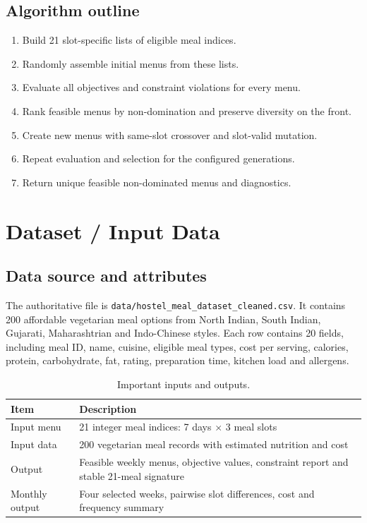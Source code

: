 \documentclass[12pt,a4paper]{report}
\begin{document}
\section{Algorithm outline}
\begin{enumerate}
\item Build 21 slot-specific lists of eligible meal indices.
\item Randomly assemble initial menus from these lists.
\item Evaluate all objectives and constraint violations for every menu.
\item Rank feasible menus by non-domination and preserve diversity on the front.
\item Create new menus with same-slot crossover and slot-valid mutation.
\item Repeat evaluation and selection for the configured generations.
\item Return unique feasible non-dominated menus and diagnostics.
\end{enumerate}

\chapter{Dataset / Input Data}
\section{Data source and attributes}
The authoritative file is \texttt{data/hostel\_meal\_dataset\_cleaned.csv}. It contains 200 affordable vegetarian meal options from North Indian, South Indian, Gujarati, Maharashtrian and Indo-Chinese styles. Each row contains 20 fields, including meal ID, name, cuisine, eligible meal types, cost per serving, calories, protein, carbohydrate, fat, rating, preparation time, kitchen load and allergens.

\begin{table}[H]
\centering
\caption{Important inputs and outputs.}
\begin{tabularx}{\textwidth}{lY}
\toprule
\textbf{Item} & \textbf{Description}\\ \midrule
Input menu & 21 integer meal indices: 7 days $\times$ 3 meal slots\\
Input data & 200 vegetarian meal records with estimated nutrition and cost\\
Output & Feasible weekly menus, objective values, constraint report and stable 21-meal signature\\
Monthly output & Four selected weeks, pairwise slot differences, cost and frequency summary\\
\bottomrule
\end{tabularx}
\end{table}
\end{document}
